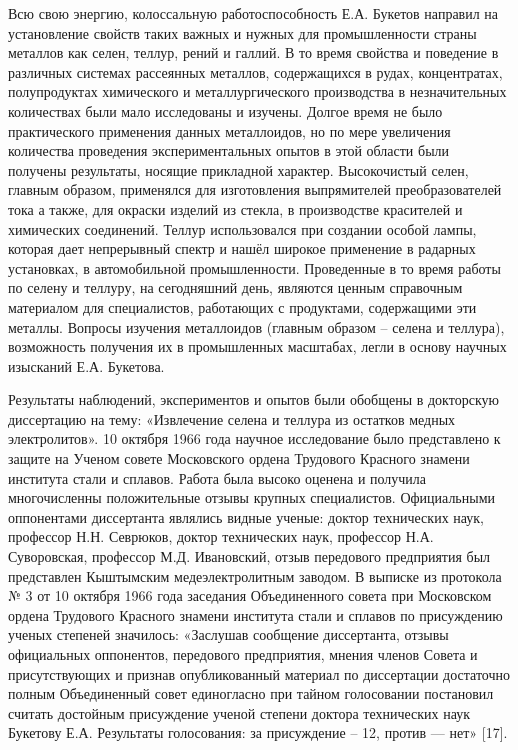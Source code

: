 Всю свою энергию, колоссальную работоспособность Е.А. Букетов направил
на установление свойств таких важных и нужных для промышленности страны
металлов как селен, теллур, рений и галлий. В то время свойства и
поведение в различных системах рассеянных металлов, содержащихся в
рудах, концентратах, полупродуктах химического и металлургического
производства в незначительных количествах были мало исследованы и
изучены. Долгое время не было практического применения данных
металлоидов, но по мере увеличения количества проведения
экспериментальных опытов в этой области были получены результаты,
носящие прикладной характер. Высокочистый селен, главным образом,
применялся для изготовления выпрямителей преобразователей тока а также,
для окраски изделий из стекла, в производстве красителей и химических
соединений. Теллур использовался при создании особой лампы, которая дает
непрерывный спектр и нашёл широкое применение в радарных установках, в
автомобильной промышленности. Проведенные в то время работы по селену и
теллуру, на сегодняшний день, являются ценным справочным материалом для
специалистов, работающих с продуктами, содержащими эти металлы. Вопросы
изучения металлоидов (главным образом -- селена и теллура), возможность
получения их в промышленных масштабах, легли в основу научных изысканий
Е.А. Букетова.

Результаты наблюдений, экспериментов и опытов были обобщены в докторскую
диссертацию на тему: «Извлечение селена и теллура из остатков медных
электролитов». 10 октября 1966 года научное исследование было
представлено к защите на Ученом совете Московского ордена Трудового
Красного знамени института стали и сплавов. Работа была высоко оценена и
получила многочисленны положительные отзывы крупных специалистов.
Официальными оппонентами диссертанта являлись видные ученые: доктор
технических наук, профессор Н.Н. Севрюков, доктор технических наук,
профессор Н.А. Суворовская, профессор М.Д. Ивановский, отзыв передового
предприятия был представлен Кыштымским медеэлектролитным заводом. В
выписке из протокола № 3 от 10 октября 1966 года заседания Объединенного
совета при Московском ордена Трудового Красного знамени института стали
и сплавов по присуждению ученых степеней значилось: «Заслушав сообщение
диссертанта, отзывы официальных оппонентов, передового предприятия,
мнения членов Совета и присутствующих и признав опубликованный материал
по диссертации достаточно полным Объединенный совет единогласно при
тайном голосовании постановил считать достойным присуждение ученой
степени доктора технических наук Букетову Е.А. Результаты голосования:
за присуждение -- 12, против --- нет» {[}17{]}.

